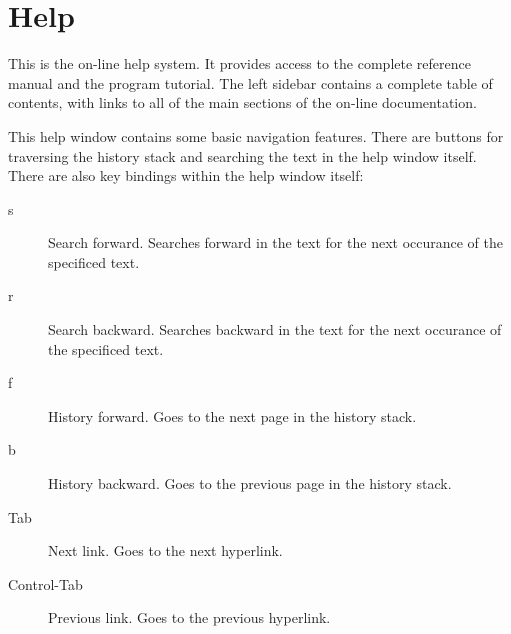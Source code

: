 \chapter{Help}
\label{Help}

This is the on-line help system. It provides access to the complete reference
manual and the program tutorial.  The left sidebar contains a complete
table of contents, with links to all of the main sections of the on-line
documentation. 

This help window contains some basic navigation features.  There are
buttons for traversing the history stack and searching the text in the
help window itself.  There are also key bindings
within the help window itself:

\begin{description}
\item[s] Search forward.  Searches forward in the text for the next
occurance of the specificed text.
\item[r] Search backward.  Searches backward in the text for the next
occurance of the specificed text.
\item[f] History forward.  Goes to the next page in the history stack.
\item[b] History backward. Goes to the previous page in the history
stack.
\item[Tab] Next link. Goes to the next hyperlink.
\item[Control-Tab] Previous link. Goes to the previous hyperlink.
\end{description}



